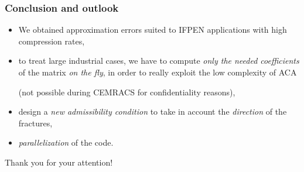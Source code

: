 \begin{frame}
\frametitle{Conclusion and outlook}

\begin{itemize}
\item
We obtained approximation errors suited to IFPEN applications with high compression rates,
\item
to treat large industrial cases, we have to compute \emph{only the needed coefficients} of the matrix \emph{on the fly}, in order to really exploit the low complexity of ACA 

(not possible during CEMRACS for confidentiality reasons),
\item
design a \emph{new admissibility condition} to take in account the \emph{direction} of the fractures,
\item
\emph{parallelization} of the code.
\end{itemize}

\pause
\bigskip
\begin{center}
Thank you for your attention!
\end{center}

\end{frame}












